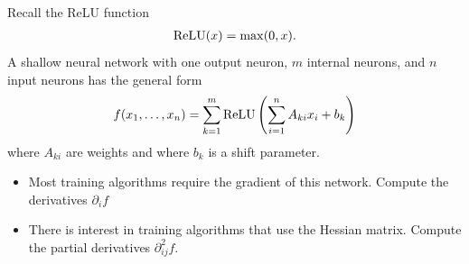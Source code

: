 \documentclass[11pt]{article}
\begin{document}

\begin{exercise}
    Recall the ReLU function 
    \begin{align}
        {\mathrm{ReLU}}(x) = \max( 0, x ).
    \end{align}
    A shallow neural network with one output neuron, $m$ internal neurons, and $n$ input neurons has the general form 
    \begin{align}
        f(x_1,\dots,x_{n}) = \sum_{k=1}^{m} {\mathrm{ReLU}}\left( \sum_{i=1}^{n} A_{ki} x_{i} + b_{k} \right)
    \end{align}
    where $A_{ki}$ are weights and where $b_{k}$ is a shift parameter. 
    \begin{itemize}
        \item Most training algorithms require the gradient of this network. Compute the derivatives $\partial_{i} f$
        \item There is interest in training algorithms that use the Hessian matrix. Compute the partial derivatives $\partial^{2}_{ij} f$.
    \end{itemize}
\end{exercise}
\end{document}
